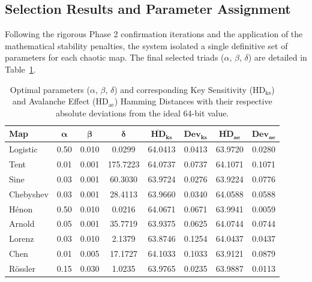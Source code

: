 \documentclass[11pt,a4paper]{report}
\begin{document}
\subsection{Selection Results and Parameter Assignment}
Following the rigorous Phase 2 confirmation iterations and the application of the mathematical stability penalties, the system isolated a single definitive set of parameters for each chaotic map. 
The final selected triads ($\alpha$, $\beta$, $\delta$) are detailed in Table~\ref{tab:chaotic_params_ranking}.

\begin{table}[htbp]
    \centering
    \small
    \setlength{\tabcolsep}{5.5pt}
    \begin{tabular}{lccccccc}
        \toprule
        \textbf{Map} & $\boldsymbol{\alpha}$ & $\boldsymbol{\beta}$ & $\boldsymbol{\delta}$ & $\overline{\textbf{HD}}_{\textbf{ks}}$ & $\textbf{Dev}_{\textbf{ks}}$ & $\overline{\textbf{HD}}_{\textbf{ae}}$ & $\textbf{Dev}_{\textbf{ae}}$ \\
        \midrule
        Logistic     & 0.50 & 0.010 &   0.0299 & 64.0413 & 0.0413 & 63.9720 & 0.0280 \\
        Tent         & 0.01 & 0.001 & 175.7223 & 64.0737 & 0.0737 & 64.1071 & 0.1071 \\
        Sine         & 0.03 & 0.001 &  60.3030 & 63.9724 & 0.0276 & 63.9224 & 0.0776 \\
        Chebyshev    & 0.03 & 0.001 &  28.4113 & 63.9660 & 0.0340 & 64.0588 & 0.0588 \\
        H\'enon      & 0.50 & 0.010 &   0.0216 & 64.0671 & 0.0671 & 63.9941 & 0.0059 \\
        Arnold       & 0.05 & 0.001 &  35.7719 & 63.9375 & 0.0625 & 64.0744 & 0.0744 \\
        Lorenz       & 0.03 & 0.010 &   2.1379 & 63.8746 & 0.1254 & 64.0437 & 0.0437 \\
        Chen         & 0.01 & 0.005 &  17.1727 & 64.1033 & 0.1033 & 63.9121 & 0.0879 \\
        R\"ossler    & 0.15 & 0.030 &   1.0235 & 63.9765 & 0.0235 & 63.9887 & 0.0113 \\
        \bottomrule
    \end{tabular}
    \caption{Optimal parameters ($\alpha$, $\beta$, $\delta$) and corresponding Key Sensitivity ($\text{HD}_{\text{ks}}$) and Avalanche Effect ($\text{HD}_{\text{ae}}$) Hamming Distances with their respective absolute deviations from the ideal 64-bit value.}
    \label{tab:chaotic_params_ranking}
\end{table}
\end{document}
